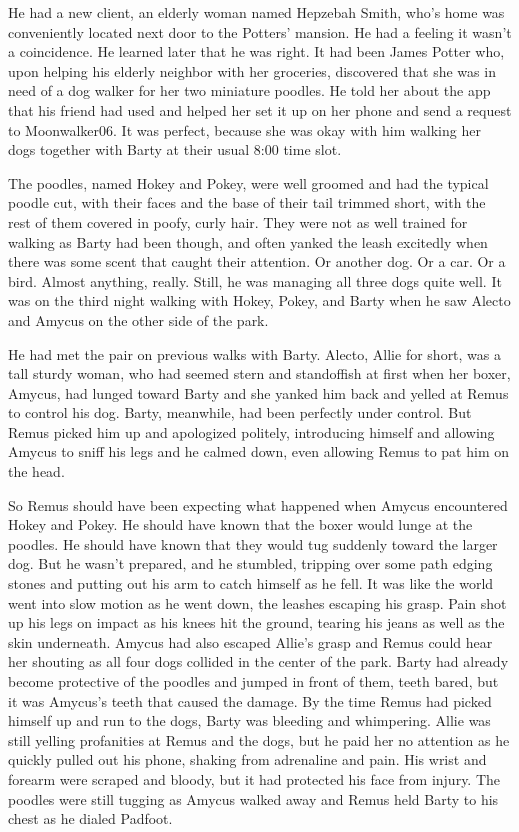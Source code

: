 \documentclass[12pt,twoside,openright]{memoir}
\begin{document}
He had a new client, an elderly woman named Hepzebah Smith, who's home was conveniently located next door to the Potters' mansion. He had a feeling it wasn't a coincidence. He learned later that he was right. It had been James Potter who, upon helping his elderly neighbor with her groceries, discovered that she was in need of a dog walker for her two miniature poodles. He told her about the app that his friend had used and helped her set it up on her phone and send a request to Moonwalker06. It was perfect, because she was okay with him walking her dogs together with Barty at their usual 8:00 time slot. 

The poodles, named Hokey and Pokey, were well groomed and had the typical poodle cut, with their faces and the base of their tail trimmed short, with the rest of them covered in poofy, curly hair. They were not as well trained for walking as Barty had been though, and often yanked the leash excitedly when there was some scent that caught their attention. Or another dog. Or a car. Or a bird. Almost anything, really. Still, he was managing all three dogs quite well. It was on the third night walking with Hokey, Pokey, and Barty when he saw Alecto and Amycus on the other side of the park. 

He had met the pair on previous walks with Barty. Alecto, Allie for short, was a tall sturdy woman, who had seemed stern and standoffish at first when her boxer, Amycus, had lunged toward Barty and she yanked him back and yelled at Remus to control his dog. Barty, meanwhile, had been perfectly under control. But Remus picked him up and apologized politely, introducing himself and allowing Amycus to sniff his legs and he calmed down, even allowing Remus to pat him on the head.

So Remus should have been expecting what happened when Amycus encountered Hokey and Pokey. He should have known that the boxer would lunge at the poodles. He should have known that they would tug suddenly toward the larger dog. But he wasn't prepared, and he stumbled, tripping over some path edging stones and putting out his arm to catch himself as he fell. It was like the world went into slow motion as he went down, the leashes escaping his grasp. Pain shot up his legs on impact as his knees hit the ground, tearing his jeans as well as the skin underneath. Amycus had also escaped Allie's grasp and Remus could hear her shouting as all four dogs collided in the center of the park. Barty had already become protective of the poodles and jumped in front of them, teeth bared, but it was Amycus's teeth that caused the damage. By the time Remus had picked himself up and run to the dogs, Barty was bleeding and whimpering. Allie was still yelling profanities at Remus and the dogs, but he paid her no attention as he quickly pulled out his phone, shaking from adrenaline and pain. His wrist and forearm were scraped and bloody, but it had protected his face from injury. The poodles were still tugging as Amycus walked away and Remus held Barty to his chest as he dialed Padfoot.
\end{document}
